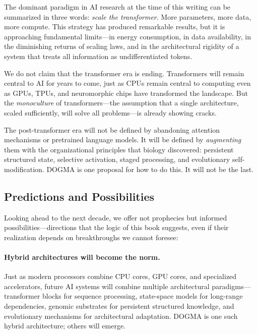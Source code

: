 The dominant paradigm in AI research at the time of this writing can be summarized in three words: \emph{scale the transformer}. More parameters, more data, more compute. This strategy has produced remarkable results, but it is approaching fundamental limits---in energy consumption, in data availability, in the diminishing returns of scaling laws, and in the architectural rigidity of a system that treats all information as undifferentiated tokens.

We do not claim that the transformer era is ending. Transformers will remain central to AI for years to come, just as CPUs remain central to computing even as GPUs, TPUs, and neuromorphic chips have transformed the landscape. But the \emph{monoculture} of transformers---the assumption that a single architecture, scaled sufficiently, will solve all problems---is already showing cracks.

\begin{keyinsight}
The post-transformer era will not be defined by abandoning attention mechanisms or pretrained language models. It will be defined by \emph{augmenting} them with the organizational principles that biology discovered: persistent structured state, selective activation, staged processing, and evolutionary self-modification. DOGMA is one proposal for how to do this. It will not be the last.
\end{keyinsight}

\subsection{Predictions and Possibilities}

Looking ahead to the next decade, we offer not prophecies but informed possibilities---directions that the logic of this book suggests, even if their realization depends on breakthroughs we cannot foresee:

\paragraph{Hybrid architectures will become the norm.} Just as modern processors combine CPU cores, GPU cores, and specialized accelerators, future AI systems will combine multiple architectural paradigms---transformer blocks for sequence processing, state-space models for long-range dependencies, genomic substrates for persistent structured knowledge, and evolutionary mechanisms for architectural adaptation. DOGMA is one such hybrid architecture; others will emerge.

